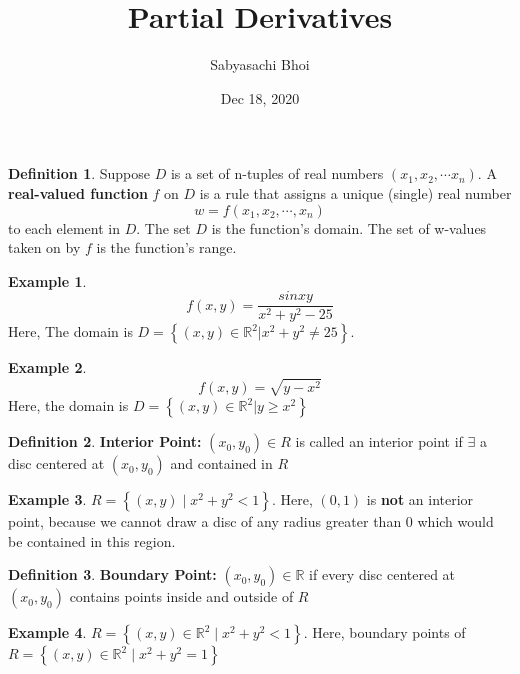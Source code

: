 \documentclass[12pt]{article}
\theoremstyle{definition}
\newtheorem*{example}{Example}
\theoremstyle{definition}
\newtheorem*{defn}{Definition}
\begin{document}
\title{Partial Derivatives}
\author{Sabyasachi Bhoi}
\date{Dec 18, 2020}
\maketitle

\begin{defn}
	Suppose $D$ is a set of n-tuples of real numbers $(x_1, x_2, \cdots x_n)$. A \textbf{real-valued function} $f$ on $D$ is a rule that assigns a unique (single) real number
	\begin{equation*}
		w = f(x_1, x_2, \cdots, x_n)
	\end{equation*}
to each element in $D$. The set $D$ is the function's domain. The set of w-values taken on by $f$ is the function's range. 
\end{defn}

\begin{example}
	\begin{equation*}
		f(x, y) = \frac{sin xy}{x^2 + y^2 - 25}
	\end{equation*}
	Here, The domain is $D = \left\{ (x, y) \in \mathbb{R}^2 | x^2 + y^2 \neq 25 \right\}$.
\end{example}

\begin{example}
	\begin{equation*}
		f(x, y) = \sqrt{y - x^2}
	\end{equation*}
	Here, the domain is $D = \left\{ (x, y) \in \mathbb{R}^2 | y \geq x^2  \right\} $
\end{example}

\begin{defn}
	\textbf{Interior Point:} $(x_0, y_0) \in R$ is called an interior point if $\exists$ a disc centered at $(x_0, y_0)$ and contained in $R$ 
\end{defn}

\begin{example}
	$R = \left\{ (x, y) \mid x^2 + y^2 < 1 \right\}$. Here, $(0, 1)$ is \textbf{not} an interior point, because we cannot draw a disc of any radius greater than 0 which would be contained in this region.
\end{example}

\begin{defn}
	\textbf{Boundary Point:} $(x_0, y_0) \in \mathbb{R}$ if every disc centered at $(x_0, y_0)$ contains points inside and outside of $R$
\end{defn}

\begin{example}
	$R = \left\{ (x, y) \in \mathbb{R}^2 \mid x^2 + y^2 < 1 \right\}$. Here, boundary points of $R = \left\{ (x, y) \in \mathbb{R}^2 \mid x^2 + y^2 = 1 \right\}$
\end{example}
\end{document}
